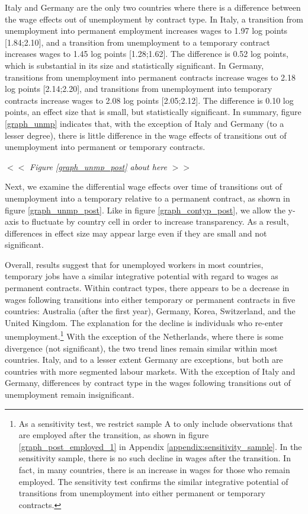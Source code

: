 \documentclass[12pt]{article}
\begin{document}
Italy and Germany are the only two countries where there is a difference between the wage effects out of unemployment by contract type.  In Italy, a transition from unemployment into permanent employment increases wages to 1.97 log points [1.84;2.10], and a transition from unemployment to a temporary contract increases wages to 1.45 log points [1.28;1.62].  The difference is 0.52 log points, which is substantial in its size and statistically significant.  In Germany, transitions from unemployment into permanent contracts increase wages to 2.18 log points [2.14;2.20], and transitions from unemployment into temporary contracts increase wages to 2.08 log points [2.05;2.12].  The difference is 0.10 log points, an effect size that is small, but statistically significant.  In summary, figure \ref{graph_unmp} indicates that, with the exception of Italy and Germany (to a lesser degree), there is little difference in the wage effects of transitions out of unemployment into permanent or temporary contracts.

\begin{center}
$<<$ \emph{Figure \ref{graph_unmp_post} about here} $>>$
\end{center}

Next, we examine the differential wage effects over time of transitions out of unemployment into a temporary relative to a permanent contract, as shown in figure \ref{graph_unmp_post}.  Like in figure \ref{graph_contyp_post}, we allow the y-axis to fluctuate by country cell in order to increase transparency.  As a result, differences in effect size may appear large even if they are small and not significant.

Overall, results suggest that for unemployed workers in most countries, temporary jobs have a similar integrative potential with regard to wages as permanent contracts.  Within contract types, there appears to be a decrease in wages following transitions into either temporary or permanent contracts in five countries:  Australia (after the first year), Germany, Korea, Switzerland, and the United Kingdom.  The explanation for the decline is individuals who re-enter unemployment.\footnote{As a sensitivity test, we restrict sample A to only include observations that are employed after the transition, as shown in figure \ref{graph_post_employed_1} in Appendix \ref{appendix:sensitivity_sample}. In the sensitivity sample, there is no such decline in wages after the transition.  In fact, in many countries, there is an increase in wages for those who remain employed.  The sensitivity test confirms the similar integrative potential of transitions from unemployment into either permanent or temporary contracts.}  With the exception of the Netherlands, where there is some divergence (not significant), the two trend lines remain similar within most countries.  Italy, and to a lesser extent Germany are exceptions, but both are countries with more segmented labour markets.  With the exception of Italy and Germany, differences by contract type in the wages following transitions out of unemployment remain insignificant.  
\end{document}
